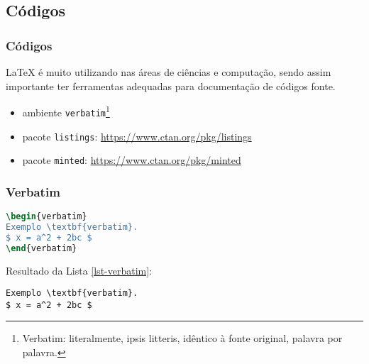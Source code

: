 \subsection{Códigos}

\begin{frame}%
\frametitle{Códigos}
\LaTeX{} é muito utilizando nas áreas de ciências e computação, sendo assim importante
ter ferramentas adequadas para documentação de códigos fonte.

\begin{itemize}
\item ambiente \texttt{verbatim}\footnote{Verbatim: literalmente, ipsis litteris, idêntico à fonte original, palavra por palavra.}
\item pacote \texttt{listings}: \url{https://www.ctan.org/pkg/listings}
\item pacote \texttt{minted}: \url{https://www.ctan.org/pkg/minted}
\end{itemize}

\end{frame}


\begin{frame}[fragile]%
\frametitle{Verbatim}

\begin{lstlisting}[language=tex, label=lst-verbatim, caption={Uso do ambiente verbatim.}, postbreak=\mbox{$\hookrightarrow$\space}, basicstyle=\fontsize{8}{10}\selectfont\ttfamily]
\begin{verbatim}
Exemplo \textbf{verbatim}.
$ x = a^2 + 2bc $
\end{verbatim}
\end{lstlisting}

Resultado da Lista \ref{lst-verbatim}:
\begin{verbatim}
Exemplo \textbf{verbatim}.
$ x = a^2 + 2bc $
\end{verbatim}

\end{frame}


